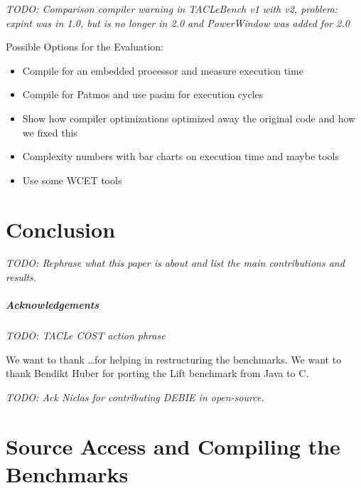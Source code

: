 \documentclass[a4paper,UKenglish]{oasics}
\newcommand{\todo}[1]{{\emph{TODO: #1}}}
\begin{document}

\todo{Comparison compiler warning in TACLeBench v1 with v2, problem: expint was in 1.0, but is no 
longer in 2.0 and PowerWindow was added for 2.0}

Possible Options for the Evaluation:

\begin{itemize}
\item Compile for an embedded processor and measure execution time
\item Compile for Patmos and use pasim for execution cycles
\item Show how compiler optimizations optimized away the original code and how we fixed this
\item Complexity numbers with bar charts on execution time and maybe tools
\item Use some WCET tools
\end{itemize}


\section{Conclusion}
\label{sec:conclusion}

\todo{Rephrase what this paper is about and list the main contributions and results.}

\subparagraph*{Acknowledgements}

\todo{TACLe COST action phrase}

We want to thank \dots for helping in restructuring the benchmarks.
We want to thank Bendikt Huber for porting the Lift benchmark from Java to C.

\todo{Ack Niclas for contributing DEBIE in open-source.}

\appendix
\section{Source Access and Compiling the Benchmarks}



\end{document}
